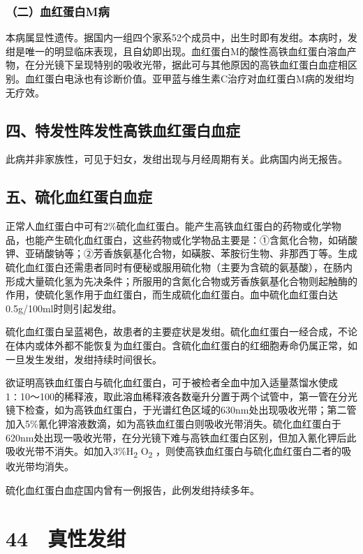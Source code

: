 \subsubsection{（二）血红蛋白M病}

本病属显性遗传。据国内一组四个家系52个成员中，出生时即有发绀。本病时，发绀是唯一的明显临床表现，且自幼即出现。血红蛋白M的酸性高铁血红蛋白溶血产物，在分光镜下呈现特别的吸收光带，据此可与其他原因的高铁血红蛋白血症相区别。血红蛋白电泳也有诊断价值。亚甲蓝与维生素C治疗对血红蛋白M病的发绀均无疗效。

\subsection{四、特发性阵发性高铁血红蛋白血症}

此病并非家族性，可见于妇女，发绀出现与月经周期有关。此病国内尚无报告。

\subsection{五、硫化血红蛋白血症}

正常人血红蛋白中可有2\%硫化血红蛋白。能产生高铁血红蛋白的药物或化学物品，也能产生硫化血红蛋白，这些药物或化学物品主要是：①含氮化合物，如硝酸钾、亚硝酸钠等；②芳香族氨基化合物，如磺胺、苯胺衍生物、非那西丁等。生成硫化血红蛋白还需患者同时有便秘或服用硫化物（主要为含硫的氨基酸），在肠内形成大量硫化氢为先决条件；所服用的含氮化合物或芳香族氨基化合物则起触酶的作用，使硫化氢作用于血红蛋白，而生成硫化血红蛋白。血中硫化血红蛋白达0.5g/100ml时则引起发绀。

硫化血红蛋白呈蓝褐色，故患者的主要症状是发绀。硫化血红蛋白一经合成，不论在体内或体外都不能恢复为血红蛋白。含硫化血红蛋白的红细胞寿命仍属正常，如一旦发生发绀，发绀持续时间很长。

欲证明高铁血红蛋白与硫化血红蛋白，可于被检者全血中加入适量蒸馏水使成1∶10～100的稀释液，取此溶血稀释液各数毫升分置于两个试管中，第一管在分光镜下检查，如为高铁血红蛋白，于光谱红色区域的630nm处出现吸收光带；第二管加入5\%氰化钾溶液数滴，如为高铁血红蛋白则吸收光带消失。硫化血红蛋白于620nm处出现一吸收光带，在分光镜下难与高铁血红蛋白区别，但加入氰化钾后此吸收光带不消失。如加入3\%H\textsubscript{2}
O\textsubscript{2}
，则使高铁血红蛋白与硫化血红蛋白二者的吸收光带均消失。

硫化血红蛋白血症国内曾有一例报告，此例发绀持续多年。

\protect\hypertarget{text00120.html}{}{}

\section{44　真性发绀}

